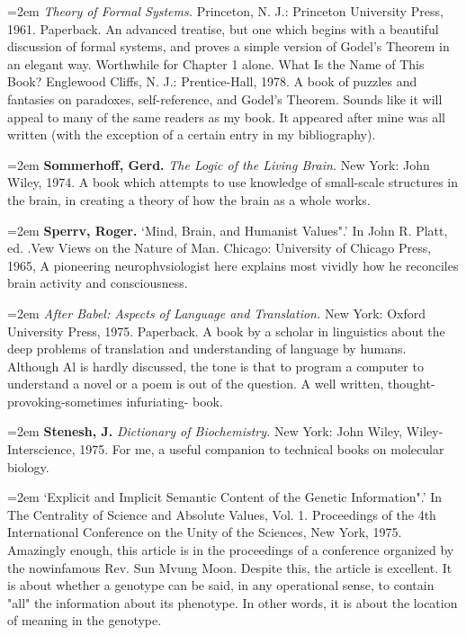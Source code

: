 \par\noindent\hangindent=2em  {\it Theory of Formal Systems.} Princeton, N. J.: Princeton University Press, 1961. Paperback. An advanced treatise, but one which begins with a beautiful discussion of formal systems, and proves a simple version of Godel's Theorem in an elegant way. Worthwhile for Chapter 1 alone. What Is the Name of This Book? Englewood Cliffs, N. J.: Prentice-Hall, 1978. A book of puzzles and fantasies on paradoxes, self-reference, and Godel's Theorem. Sounds like it will appeal to many of the same readers as my book. It appeared after mine was all written (with the exception of a certain entry in my bibliography).

\par\noindent\hangindent=2em {\bf Sommerhoff, Gerd.} {\it The Logic of the Living Brain.} New York: John Wiley, 1974. A book which attempts to use knowledge of small-scale structures in the brain, in creating a theory of how the brain as a whole works.

\par\noindent\hangindent=2em {\bf Sperrv, Roger.} `Mind, Brain, and Humanist Values".' In John R. Platt, ed. .Vew Views on the Nature of Man. Chicago: University of Chicago Press, 1965, A pioneering neurophvsiologist here explains most vividly how he reconciles brain activity and consciousness.

\par\noindent\hangindent=2em  {\it After Babel: Aspects of Language and Translation.} New York: Oxford University Press, 1975. Paperback. A book by a scholar in linguistics about the deep problems of translation and understanding of language by humans. Although Al is hardly discussed, the tone is that to program a computer to understand a novel or a poem is out of the question. A well written, thought-provoking-sometimes infuriating- book.

\par\noindent\hangindent=2em {\bf Stenesh, J.} {\it Dictionary of Biochemistry.} New York: John Wiley, Wiley-Interscience, 1975. For me, a useful companion to technical books on molecular biology.

\par\noindent\hangindent=2em  `Explicit and Implicit Semantic Content of the Genetic Information".' In The Centrality of Science and Absolute Values, Vol. 1. Proceedings of the 4th International Conference on the Unity of the Sciences, New York, 1975. Amazingly enough, this article is in the proceedings of a conference organized by the nowinfamous Rev. Sun Mvung Moon. Despite this, the article is excellent. It is about whether a genotype can be said, in any operational sense, to contain "all" the information about its phenotype. In other words, it is about the location of meaning in the genotype.


